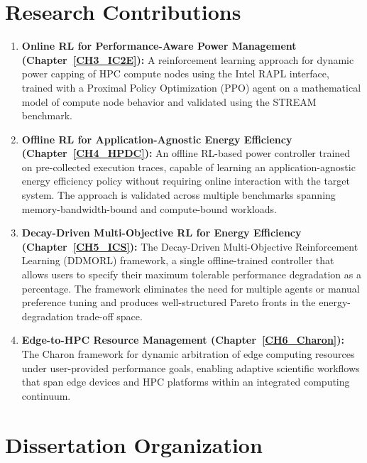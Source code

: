 \section{Research Contributions}

\begin{enumerate}

    \item \textbf{Online RL for Performance-Aware Power Management (Chapter~\ref{CH3_IC2E}):}
    A reinforcement learning approach for dynamic power capping of HPC compute nodes
    using the Intel RAPL interface, trained with a Proximal Policy Optimization (PPO)
    agent on a mathematical model of compute node behavior and validated using the
    STREAM benchmark.

    \item \textbf{Offline RL for Application-Agnostic Energy Efficiency (Chapter~\ref{CH4_HPDC}):}
    An offline RL-based power controller trained on pre-collected execution traces,
    capable of learning an application-agnostic energy efficiency policy without
    requiring online interaction with the target system. The approach is validated
    across multiple benchmarks spanning memory-bandwidth-bound and compute-bound
    workloads.

    \item \textbf{Decay-Driven Multi-Objective RL for Energy Efficiency (Chapter~\ref{CH5_ICS}):}
    The Decay-Driven Multi-Objective Reinforcement Learning (DDMORL) framework, a
    single offline-trained controller that allows users to specify their maximum
    tolerable performance degradation as a percentage. The framework eliminates the
    need for multiple agents or manual preference tuning and produces well-structured
    Pareto fronts in the energy-degradation trade-off space.

    \item \textbf{Edge-to-HPC Resource Management (Chapter~\ref{CH6_Charon}):}
    The Charon framework for dynamic arbitration of edge computing resources under
    user-provided performance goals, enabling adaptive scientific workflows that
    span edge devices and HPC platforms within an integrated computing continuum.

\end{enumerate}

\section{Dissertation Organization}

